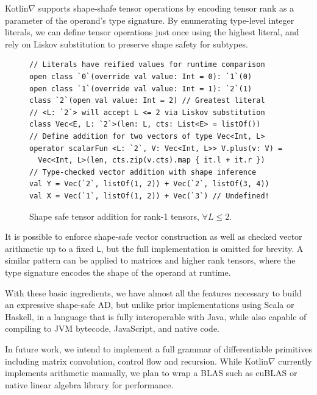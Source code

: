 \documentclass{article}
\newcommand{\squeezeup}{\vspace{-2.5mm}}
\begin{document}
\squeezeup Kotlin$\nabla$ supports shape-shafe tensor operations by encoding tensor rank as a parameter of the operand's type signature. By enumerating type-level integer literals, we can define tensor operations just once using the highest literal, and rely on Liskov substitution to preserve shape safety for subtypes.

\begin{figure}[!htb]
\begin{verbatim}
// Literals have reified values for runtime comparison
open class `0`(override val value: Int = 0): `1`(0)
open class `1`(override val value: Int = 1): `2`(1)
class `2`(open val value: Int = 2) // Greatest literal
// <L: `2`> will accept L <= 2 via Liskov substitution
class Vec<E, L: `2`>(len: L, cts: List<E> = listOf())
// Define addition for two vectors of type Vec<Int, L>
operator scalarFun <L: `2`, V: Vec<Int, L>> V.plus(v: V) =
  Vec<Int, L>(len, cts.zip(v.cts).map { it.l + it.r })
// Type-checked vector addition with shape inference
val Y = Vec(`2`, listOf(1, 2)) + Vec(`2`, listOf(3, 4))
val X = Vec(`1`, listOf(1, 2)) + Vec(`3`) // Undefined!
\end{verbatim}
\squeezeup\squeezeup\caption{Shape safe tensor addition for rank-1 tensors, $\forall L\leq2.$}\squeezeup
\end{figure}

It is possible to enforce shape-safe vector construction as well as checked vector arithmetic up to a fixed \texttt{L}, but the full implementation is omitted for brevity. A similar pattern can be applied to matrices and higher rank tensors, where the type signature encodes the shape of the operand at runtime.

With these basic ingredients, we have almost all the features necessary to build an expressive shape-safe AD, but unlike prior implementations using Scala or Haskell, in a language that is fully interoperable with Java, while also capable of compiling to JVM bytecode, JavaScript, and native code.

In future work, we intend to implement a full grammar of differentiable primitives including matrix convolution, control flow and recursion. While Kotlin$\nabla$ currently implements arithmetic manually, we plan to wrap a BLAS such as cuBLAS or native linear algebra library for performance.

\squeezeup

\end{document}
